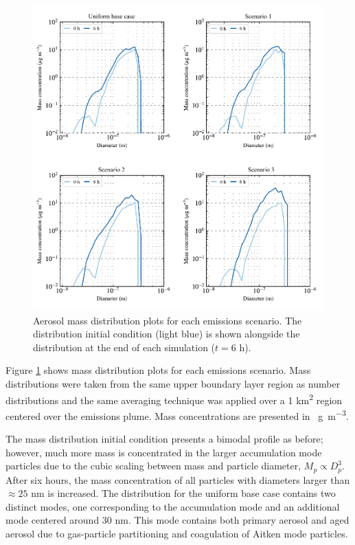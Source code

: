 \begin{figure}[!t]
  \centering
    \includegraphics[width=\textwidth]{figures/chapter5/mass-distribution-plots.pdf}
    \caption{Aerosol mass distribution plots for each emissions scenario. The distribution initial condition (light blue) is shown alongside the distribution at the end of each simulation ($t=6$ h).}
    \label{fig:mass-dists}
\end{figure}

Figure \ref{fig:mass-dists} shows mass distribution plots for each emissions scenario. Mass distributions were taken from the same upper boundary layer region as number distributions and the same averaging technique was applied over a 1 \si{km^2} region centered over the emissions plume. Mass concentrations are presented in \si{\mu g.m^{-3}}. 

The mass distribution initial condition presents a bimodal profile as before; however, much more mass is concentrated in the larger accumulation mode particles due to the cubic scaling between mass and particle diameter, $M_p \propto D_p^3$. After six hours, the mass concentration of all particles with diameters larger than $\approx25$ nm is increased. The distribution for the uniform base case contains two distinct modes, one corresponding to the accumulation mode and an additional mode centered around $30$ nm. This mode contains both primary aerosol and aged aerosol due to gas-particle partitioning and coagulation of Aitken mode particles. 


